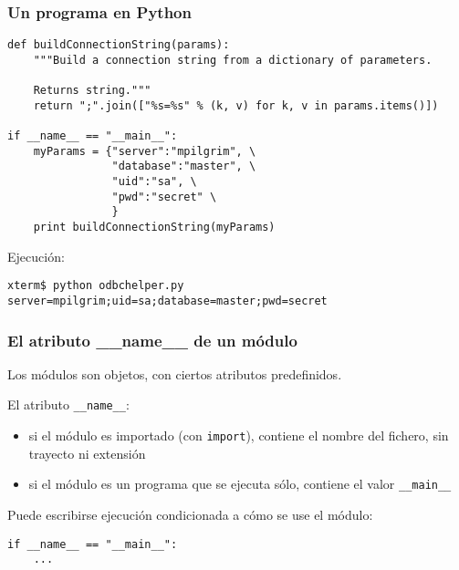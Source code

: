 \begin{frame}[fragile]
\frametitle{Un programa en Python}

\begin{footnotesize}
\begin{verbatim}
def buildConnectionString(params):
    """Build a connection string from a dictionary of parameters.

    Returns string."""
    return ";".join(["%s=%s" % (k, v) for k, v in params.items()])

if __name__ == "__main__":
    myParams = {"server":"mpilgrim", \
                "database":"master", \
                "uid":"sa", \
                "pwd":"secret" \
                }
    print buildConnectionString(myParams) 
\end{verbatim}
\end{footnotesize}

Ejecución:
\begin{footnotesize}
\begin{verbatim}
xterm$ python odbchelper.py
server=mpilgrim;uid=sa;database=master;pwd=secret
\end{verbatim}
\end{footnotesize}
 
\end{frame}



\begin{frame}[fragile]
\frametitle{El atributo \_\_name\_\_ de un módulo}

Los módulos son objetos, con ciertos atributos predefinidos.

El atributo \verb|__name__|:
\begin{itemize}
\item si el módulo es importado (con \verb|import|), contiene el
  nombre del fichero, sin trayecto ni extensión
\item si el módulo es un programa que se ejecuta sólo, contiene el
  valor \verb|__main__|
\end{itemize}

Puede escribirse ejecución condicionada a cómo se use el módulo:
\begin{footnotesize}
\begin{verbatim}
if __name__ == "__main__": 
    ...
\end{verbatim}
\end{footnotesize}
  
\end{frame}




